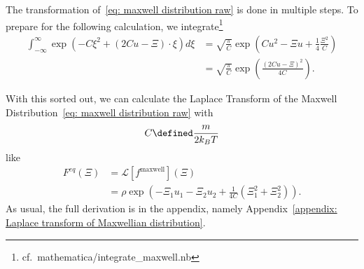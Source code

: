 The transformation of~\eqref{eq: maxwell distribution raw} is done in multiple steps.
To prepare for the following calculation, we integrate\footnote{cf.\ mathematica/integrate\_maxwell.nb}
\begin{equation}
  \label{eq:integrate exponential sage}
  \begin{aligned}
    \int_{-\infty}^{\infty} \exp \left(-C \xi^2 + (2Cu - \Xi)\cdot\xi \right) d\xi
    & = \sqrt{\frac{\pi}{C}}\exp \left(Cu^2 - \Xi u + \frac{1}{4} \frac{\Xi^2}{C}\right) \\
    & = \sqrt{\frac{\pi}{C}}\exp \left( \frac{{(2Cu-\Xi)}^2}{4C}\right).
  \end{aligned}
\end{equation}

With this sorted out, we can calculate the Laplace Transform of the Maxwell Distribution~\eqref{eq: maxwell distribution raw} with
\begin{equation}
  C \defined \frac{m}{2 k_B T}
\end{equation}
like
\begin{equation}
  \label{eq: laplace of maxwell}
  \begin{aligned}
    F^{eq}(\Xi) & = \mathcal{L}[f^{\text{maxwell}}](\Xi)
    \\& = \rho
      \exp \left( -\Xi_1 u_1 - \Xi_2 u_2 + \frac{1}{4C}\left(\Xi_1^2 + \Xi_2^2 \right)\right).
  \end{aligned}
\end{equation}
As usual, the full derivation is in the appendix, namely Appendix~\ref{appendix: Laplace transform of Maxwellian distribution}.
